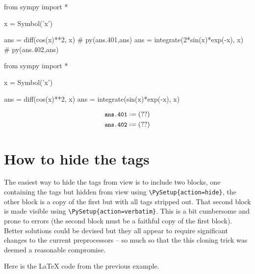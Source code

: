 \documentclass[12pt]{pylatex}
\begin{document}

\begin{python}
   from sympy import *

   x = Symbol('x')

   ans = diff(cos(x)**2, x)                         # py(ans.401,ans)
   ans = integrate(2*sin(x)*exp(-x), x)             # py(ans.402,ans)
\end{python}


\begin{python}
   from sympy import *

   x = Symbol('x')

   ans = diff(cos(x)**2, x)
   ans = integrate(sin(x)*exp(-x), x)
\end{python}

\begin{align*}
   &\py*{ans.401}\\
   &\py*{ans.402}
\end{align*}

\clearpage

\section*{How to hide the tags}
The easiest way to hide the tags from view is to include two blocks, one containing the tags but hidden from view using {\tt\small\verb|\PySetup{action=hide}|}, the other block is a copy of the first but with all tags stripped out. That second block is made visible using {\tt\small\verb|\PySetup{action=verbatim}|}. This is a bit cumbersome and prone to errors (the second block must be a faithful copy of the first block). Better solutions could be devised but they all appear to require significant changes to the current preprocessors -- so much so that the this cloning trick was deemed a reasonable compromise.

Here is the LaTeX code from the previous example.

\vspace{-5pt}
\end{document}

